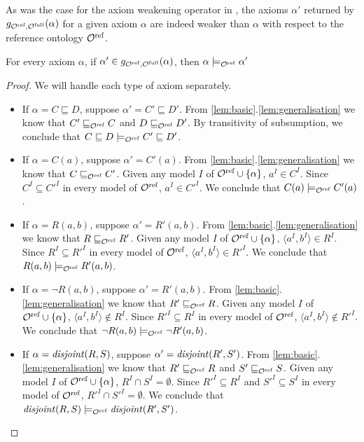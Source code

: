 As was the case for the axiom weakening operator in \ALC, the axioms $\alpha'$ returned by $g_{{\mathcal{O}^\textnormal{ref}},{\mathcal{O}^\textnormal{full}}}(\alpha)$ for a given axiom $\alpha$ are indeed weaker than $\alpha$ with respect to the reference ontology ${\mathcal{O}^\textnormal{ref}}$.

\begin{lemma} \label{lem:weaker}
For every \SROIQ axiom $\alpha$, if $\alpha' \in g_{{\mathcal{O}^\textnormal{ref}},{\mathcal{O}^\textnormal{full}}}(\alpha)$, then $\alpha \models_{\mathcal{O}^\textnormal{ref}} \alpha'$
\end{lemma}

\begin{proof} We will handle each type of axiom separately.
\begin{itemize}
    \item If $\alpha = C \sqsubseteq D$, suppose $\alpha' = C' \sqsubseteq D'$. From \cref{lem:basic}.\ref{lem:generalisation} we know that $C' \sqsubseteq_{\mathcal{O}^\textnormal{ref}} C$ and $D \sqsubseteq_{\mathcal{O}^\textnormal{ref}} D'$. By transitivity of subsumption, we conclude that $C \sqsubseteq D \models_{\mathcal{O}^\textnormal{ref}} C' \sqsubseteq D'$.
    \item If $\alpha = C(a)$, suppose $\alpha' = C'(a)$. From \cref{lem:basic}.\ref{lem:generalisation} we know that $C \sqsubseteq_{\mathcal{O}^\textnormal{ref}} C'$. Given any model $I$ of ${\mathcal{O}^\textnormal{ref}} \cup \{ \alpha \}$, $a^I \in C^I$. Since $C^I \subseteq C'^I$ in every model of ${\mathcal{O}^\textnormal{ref}}$, $a^I \in C'^I$. We conclude that $C(a) \models_{\mathcal{O}^\textnormal{ref}} C'(a)$.
    \item If $\alpha = R(a, b)$, suppose $\alpha' = R'(a, b)$. From \cref{lem:basic}.\ref{lem:generalisation} we know that $R \sqsubseteq_{\mathcal{O}^\textnormal{ref}} R'$. Given any model $I$ of ${\mathcal{O}^\textnormal{ref}} \cup \{ \alpha \}$, $\langle a^I, b^I \rangle \in R^I$. Since $R^I \subseteq R'^I$ in every model of ${\mathcal{O}^\textnormal{ref}}$, $\langle a^I, b^I \rangle \in R'^I$. We conclude that $R(a, b) \models_{\mathcal{O}^\textnormal{ref}} R'(a, b)$.
    \item If $\alpha = \lnot R(a, b)$, suppose $\alpha' = R'(a, b)$. From \cref{lem:basic}.\ref{lem:generalisation} we know that $R' \sqsubseteq_{\mathcal{O}^\textnormal{ref}} R$. Given any model $I$ of ${\mathcal{O}^\textnormal{ref}} \cup \{ \alpha \}$, $\langle a^I, b^I \rangle \not\in R^I$. Since $R'^I \subseteq R^I$ in every model of ${\mathcal{O}^\textnormal{ref}}$, $\langle a^I, b^I \rangle \not\in R'^I$. We conclude that $\lnot R(a, b) \models_{\mathcal{O}^\textnormal{ref}} \lnot R'(a, b)$.
    \item If $\alpha = \mathit{disjoint}(R, S)$, suppose $\alpha' = \mathit{disjoint}(R', S')$. From \cref{lem:basic}.\ref{lem:generalisation} we know that $R' \sqsubseteq_{\mathcal{O}^\textnormal{ref}} R$ and $S' \sqsubseteq_{\mathcal{O}^\textnormal{ref}} S$. Given any model $I$ of ${\mathcal{O}^\textnormal{ref}} \cup \{ \alpha \}$, $R^I \cap S^I = \emptyset$. Since $R'^I \subseteq R^I$ and $S'^I \subseteq S^I$ in every model of ${\mathcal{O}^\textnormal{ref}}$, $R'^I \cap S'^I = \emptyset$. We conclude that $\mathit{disjoint}(R, S) \models_{\mathcal{O}^\textnormal{ref}} \mathit{disjoint}(R', S')$.

\end{itemize}
\end{proof}
